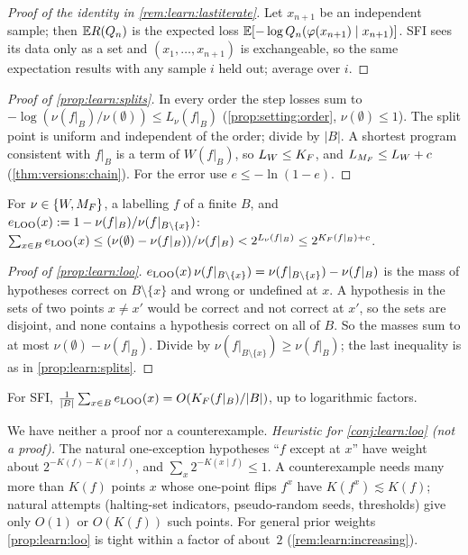 \begin{proof}[Proof of the identity in \cref{rem:learn:lastiterate}]
Let $x_{n+1}$ be an independent sample; then $\mathbb{E} R(Q_n)$ is the expected loss $\mathbb{E}[-\log Q_n(\varphi(x_{n+1})\mid x_{n+1})]$. SFI sees its data only as a set and $(x_1,\dots,x_{n+1})$ is exchangeable, so the same expectation results with any sample $i$ held out; average over $i$.
\end{proof}

\begin{proof}[Proof of \cref{prop:learn:splits}]
In every order the step losses sum to $-\log(\nu(f|_B)/\nu(\emptyset))\le L_\nu(f|_B)$ (\cref{prop:setting:order}, $\nu(\emptyset)\le1$). The split point is uniform and independent of the order; divide by $|B|$. A shortest program consistent with $f|_B$ is a term of $W(f|_B)$, so $L_W\le K_{F}$, and $L_{M_{F}}\le L_W+c$ (\cref{thm:versions:chain}). For the error use $e\le-\ln(1-e)$.
\end{proof}

\begin{proposition}\label{prop:learn:loo}
For $\nu\in\{W,M_{F}\}$, a labelling $f$ of a finite $B$, and $e_{\rm LOO}(x):=1-\nu(f|_B)/\nu(f|_{B\setminus\{x\}})$: $\sum_{x\in B}e_{\rm LOO}(x)\le(\nu(\emptyset)-\nu(f|_B))/\nu(f|_B)<2^{L_\nu(f|_B)}\le2^{K_{F}(f|_B)+c}$.
\end{proposition}

\begin{proof}[Proof of \cref{prop:learn:loo}]
$e_{\rm LOO}(x)\,\nu(f|_{B\setminus\{x\}})=\nu(f|_{B\setminus\{x\}})-\nu(f|_B)$ is the mass of hypotheses correct on $B\setminus\{x\}$ and wrong or undefined at $x$. A hypothesis in the sets of two points $x\ne x'$ would be correct and not correct at $x'$, so the sets are disjoint, and none contains a hypothesis correct on all of $B$. So the masses sum to at most $\nu(\emptyset)-\nu(f|_B)$. Divide by $\nu(f|_{B\setminus\{x\}})\ge\nu(f|_B)$; the last inequality is as in \cref{prop:learn:splits}.
\end{proof}

\begin{conjecture}\label{conj:learn:loo}
For SFI, $\frac1{|B|}\sum_{x\in B}e_{\rm LOO}(x)=O(K_{F}(f|_B)/|B|)$, up to logarithmic factors.
\end{conjecture}

We have neither a proof nor a counterexample.
\emph{Heuristic for \cref{conj:learn:loo} (not a proof).} The natural one-exception hypotheses ``$f$ except at $x$'' have weight about $2^{-K(f)-K(x\mid f)}$, and $\sum_x2^{-K(x\mid f)}\le1$. A counterexample needs many more than $K(f)$ points $x$ whose one-point flips $f^x$ have $K(f^x)\lesssim K(f)$; natural attempts (halting-set indicators, pseudo-random seeds, thresholds) give only $O(1)$ or $O(K(f))$ such points. For general prior weights \cref{prop:learn:loo} is tight within a factor of about~$2$ (\cref{rem:learn:increasing}).

